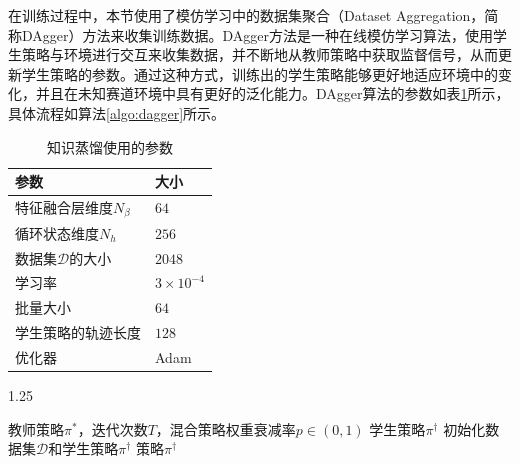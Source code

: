 在训练过程中，本节使用了模仿学习中的数据集聚合（Dataset Aggregation，简称DAgger）\cite{ross2011reduction}方法来收集训练数据。DAgger方法是一种在线模仿学习算法，使用学生策略与环境进行交互来收集数据，并不断地从教师策略中获取监督信号，从而更新学生策略的参数。通过这种方式，训练出的学生策略能够更好地适应环境中的变化，并且在未知赛道环境中具有更好的泛化能力。DAgger算法的参数如表\ref{tab:kd-hyper-param}所示，具体流程如算法\ref{algo:dagger}所示。
\begin{table}[ht]
    \caption{\label{tab:kd-hyper-param}知识蒸馏使用的参数}
    \renewcommand{\arraystretch}{1.25}
    \begin{tabularx}{\linewidth}{X<{\centering} X<{\centering}}
        \toprule[2pt]
        参数 & 大小 \\ \midrule[1pt]
        特征融合层维度$N_\beta$ & $64$ \\
        循环状态维度$N_h$ & $256$ \\
        数据集$\mathcal{D}$的大小 & $2048$ \\
        学习率 & $3\times 10^{-4}$ \\
        批量大小 & $64$ \\
        学生策略的轨迹长度 & $128$ \\
        优化器 & Adam \\\bottomrule[2pt]
    \end{tabularx}
\end{table}
\begin{algorithm}[H]
    \begin{spacing}{1.25}
	\caption{DAgger算法}
    \renewcommand{\arraystretch}{1.25}
	\label{algo:dagger}
	\begin{algorithmic}[1]
        \REQUIRE 教师策略$\pi^\ast$，迭代次数$T$，混合策略权重衰减率$p\in(0,1)$
		\ENSURE 学生策略$\pi^\dagger$
        \STATE 初始化数据集$\mathcal{D}$和学生策略$\pi^\dagger$
        \ENDFOR
        \RETURN 策略$\pi^\dagger$
	\end{algorithmic}
    \end{spacing}
\end{algorithm}

